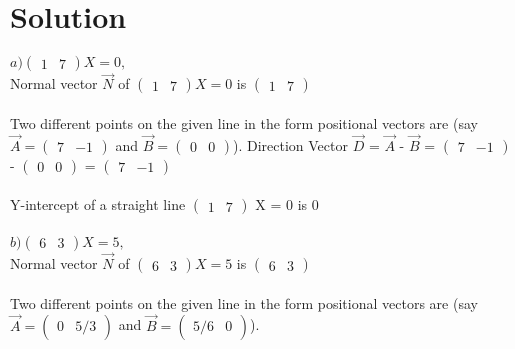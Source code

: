 \documentclass[journal,12pt,twocolumn]{IEEEtran}
\begin{document}
\section{Solution}
$
a) \begin{pmatrix} 1 & 7\end{pmatrix} X = 0,
$
\\
Normal vector $\vec{N}$ of $ \begin{pmatrix} 1 & 7\end{pmatrix} X = 0 $ is  $ \begin{pmatrix} 1 & 7\end{pmatrix} $ 
\\
\\
	Two different points on the given line in the form positional vectors are (say $\vec{A} = \begin{pmatrix} 7 & -1\end{pmatrix} $ and $\vec{B} = \begin{pmatrix} 0 & 0 \end{pmatrix} $).
Direction Vector $\vec{D}$ = $\vec{A}$ - $\vec{B}$ = $\begin{pmatrix} 7 & -1 \end{pmatrix} $ - $\begin{pmatrix} 0 & 0 \end{pmatrix} $ = $\begin{pmatrix} 7 & -1 \end{pmatrix} $
\\
\\
Y-intercept of a straight line $\begin{pmatrix} 1 & 7\end{pmatrix}$ X = 0 is 0
\\
\\
$
b) \begin{pmatrix} 6 & 3\end{pmatrix} X = 5,
$
\\
Normal vector $\vec{N}$ of $ \begin{pmatrix} 6 & 3 \end{pmatrix} X = 5 $ is  $ \begin{pmatrix} 6 & 3\end{pmatrix} $ 
\\
\\
Two different points on the given line in the form positional vectors are (say $\vec{A} = \begin{pmatrix} 0 & 5/3 \end{pmatrix} $ and $\vec{B} = \begin{pmatrix} 5/6 & 0 \end{pmatrix} $).
\end{document}
